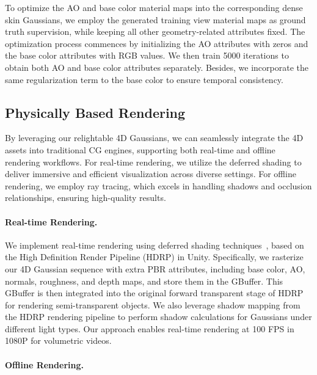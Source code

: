 To optimize the AO and base color material maps into the corresponding dense skin Gaussians, we employ the generated training view material maps as ground truth supervision, while keeping all other geometry-related attributes fixed.
The optimization process commences by initializing the AO attributes with zeros and the base color attributes with RGB values. We then train 5000 iterations to obtain both AO and base color attributes separately. Besides, we incorporate the same regularization term to the base color to ensure temporal consistency.
\subsection{Physically Based Rendering}
\label{sec_3_3}

By leveraging our relightable 4D Gaussians, we can seamlessly integrate the 4D assets into traditional CG engines, supporting both real-time and offline rendering workflows.
For real-time rendering, we utilize the deferred shading to deliver immersive and efficient visualization across diverse settings. For offline rendering, we employ ray tracing, which excels in handling shadows and occlusion relationships, ensuring high-quality results.
\paragraph{Real-time Rendering.}
We implement real-time rendering using deferred shading techniques~\cite{deering1988deferred}, based on the High Definition Render Pipeline (HDRP) in Unity. Specifically, we rasterize our 4D Gaussian sequence with extra PBR attributes, including base color, AO, normals, roughness, and depth maps, and store them in the GBuffer. This GBuffer is then integrated into the original forward transparent stage of HDRP for rendering semi-transparent objects. We also leverage shadow mapping from the HDRP rendering pipeline to perform shadow calculations for Gaussians under different light types. Our approach enables real-time rendering at 100 FPS in 1080P for volumetric videos.




\paragraph{Offline Rendering.} 

